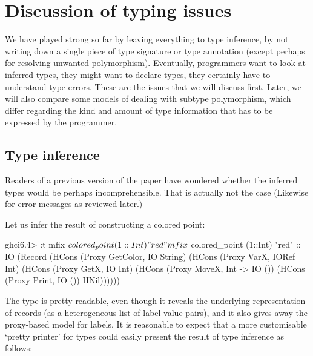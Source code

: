 \medskip

\section{Discussion of typing issues}
\label{S:types}

We have played strong so far by leaving everything to type inference,
by not writing down a single piece of type signature or type
annotation (except perhaps for resolving unwanted polymorphism).
Eventually, programmers want to look at inferred types, they might
want to declare types, they certainly have to understand type
errors. These are the issues that we will discuss first. Later, we will
also compare some models of dealing with subtype polymorphism, which
differ regarding the kind and amount of type information that has to
be expressed by the programmer.






\medskip

\subsection{Type inference}

Readers of a previous version of the paper have wondered whether the
inferred types would be perhaps incomprehensible. That is actually not
the case (Likewise for error messages as reviewed later.)

Let us infer the result of constructing a colored point:
 
\begin{code}
 ghci6.4> :t mfix $ colored_point (1::Int) "red"
 mfix $ colored_point (1::Int) "red" ::
        IO (Record 
            (HCons (Proxy GetColor, IO String)
             (HCons (Proxy VarX, IORef Int)
              (HCons (Proxy GetX, IO Int)
               (HCons (Proxy MoveX, Int -> IO ())
                (HCons (Proxy Print, IO ())
                 HNil))))))
\end{code} 

The type is pretty readable, even though it reveals the underlying
representation of records (as a heterogeneous list of label-value
pairs), and it also gives away the proxy-based model for labels.  It
is reasonable to expect that a more customisable `pretty printer' for
types could easily present the result of type inference as
follows:

